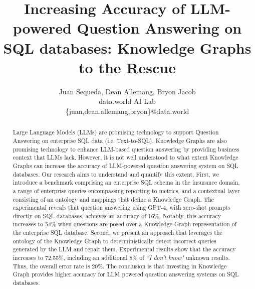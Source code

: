 \documentclass[11pt]{article}
\begin{document}
\title{Increasing Accuracy of LLM-powered Question Answering on SQL databases: Knowledge Graphs to the Rescue}



\author{Juan Sequeda, Dean Allemang, Bryon Jacob\\
data.world AI Lab \\
\{juan,dean.allemang,bryon\}@data.world}


\maketitle


\begin{abstract}
Large Language Models (LLMs) are promising technology to support Question Answering on enterprise SQL data (i.e. Text-to-SQL). 
Knowledge Graphs are also promising technology to enhance LLM-based question answering by providing business context that LLMs lack.
However, it is not well understood to what extent Knowledge Graphs can increase the accuracy of LLM-powered question answering system on SQL databases. 
Our research aims to understand and quantify this extent. 
First, we introduce a benchmark comprising an enterprise SQL schema in the insurance domain, a range of enterprise queries encompassing reporting to metrics, and a contextual layer consisting of an ontology and mappings that define a Knowledge Graph.
The experimental reveals that question answering using GPT-4, with zero-shot prompts directly on SQL databases, achieves an accuracy of 16\%. 
Notably, this accuracy increases to 54\% when questions are posed over a Knowledge Graph representation of the enterprise SQL database.
Second, we present an approach that leverages the ontology of the Knowledge Graph to deterministically detect incorrect queries generated by the LLM and repair them. 
Experimental results show that the accuracy increases to 72.55\%, including an additional 8\% of \textit{``I don't know"} unknown results. 
Thus, the overall error rate is 20\%.
The conclusion is that investing in Knowledge Graph provides higher accuracy for LLM powered question answering systems on SQL databases.
\end{abstract}
\end{document}
